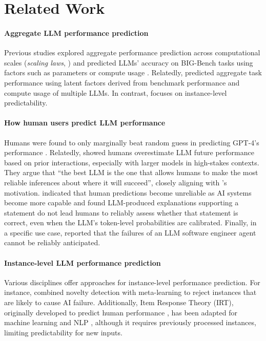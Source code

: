 \section{Related Work}
\label{sec:related_works}

\paragraph{Aggregate LLM performance prediction} Previous studies explored aggregate performance prediction across computational scales (\textit{scaling laws}, \citealp{kaplan2020scaling, hernandez2020measuring}) and predicted  LLMs' accuracy on BIG-Bench \citep{srivastava2023imitationgamequantifyingextrapolating} tasks using factors such as parameters or compute usage \citep{ye2023how,owen2024predictable}. Relatedly, \citet{ruan2024observational} %
predicted aggregate task performance using latent factors derived from benchmark performance and compute usage of multiple LLMs. 
In contrast, \predbench focuses on instance-level predictability.

\paragraph{How human users predict LLM performance}
Humans were found 
to only marginally beat random guess in predicting GPT-4's performance \citep{carlini_gpt4_challenge}. 
Relatedly, \citet{vafa2024largelanguagemodelsperform} showed humans overestimate LLM future performance based on prior interactions, especially with larger models in high-stakes contexts. They argue that ``the best LLM is the one that allows humans to make the most reliable inferences about where it will succeed'', closely aligning with \predbench's motivation. \citet{zhou2024larger} indicated that human predictions become unreliable as AI systems become more capable 
and \citet{steyvers2025large} found LLM-produced explanations supporting a statement do not lead humans to reliably assess whether that statement is correct, even when the LLM's token-level probabilities are calibrated. %
Finally, in a specific use case, \citet{bansalchallenges} reported that the failures of an LLM software engineer agent cannot be reliably anticipated.

\paragraph{Instance-level LLM performance prediction}
Various disciplines offer approaches for instance-level performance prediction. For instance, \citet{drapal2024MetaLearningNoveltyDetection} combined novelty detection with meta-learning to reject instances that are likely to cause %
AI failure. Additionally, Item Response Theory (IRT), originally developed to predict human performance %
\cite{embretson2013item}, has been adapted for machine learning and NLP \cite{martinez2019item,lalor2016building,kipnis2024metabench,polo2024tinybenchmarks,vania-etal-2021-comparing}, although it requires previously processed instances, limiting predictability for new inputs. %


